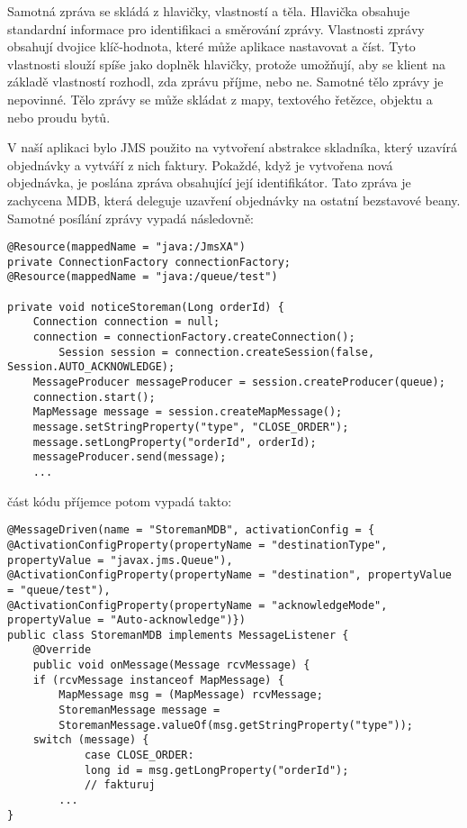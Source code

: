 \documentclass[122pt,oneside]{fithesis}
\begin{document}
Samotná zpráva se skládá z hlavičky, vlastností a těla. Hlavička obsahuje standardní informace pro identifikaci a směrování zprávy. Vlastnosti zprávy obsahují dvojice klíč-hodnota, které může aplikace nastavovat a číst. Tyto vlastnosti slouží spíše jako doplněk hlavičky, protože umožňují, aby se klient na základě vlastností rozhodl, zda zprávu příjme, nebo ne. Samotné tělo zprávy je nepovinné. Tělo zprávy se může skládat z mapy, textového řetězce, objektu a nebo proudu bytů.

V naší aplikaci bylo JMS použito na vytvoření abstrakce skladníka, který uzavírá objednávky a vytváří z nich faktury. Pokaždé, když je vytvořena nová objednávka, je poslána zpráva obsahující její identifikátor. Tato zpráva je zachycena MDB, která deleguje uzavření objednávky na ostatní bezstavové beany. Samotné posílání zprávy vypadá následovně:

\begin{lstlisting}
@Resource(mappedName = "java:/JmsXA")
private ConnectionFactory connectionFactory;
@Resource(mappedName = "java:/queue/test")

private void noticeStoreman(Long orderId) {
	Connection connection = null;
	connection = connectionFactory.createConnection();
		Session session = connection.createSession(false, Session.AUTO_ACKNOWLEDGE);
	MessageProducer messageProducer = session.createProducer(queue);
	connection.start();
	MapMessage message = session.createMapMessage();
	message.setStringProperty("type", "CLOSE_ORDER");
	message.setLongProperty("orderId", orderId);
	messageProducer.send(message);
	... 
\end{lstlisting}

část kódu příjemce potom vypadá takto:

\begin{lstlisting}
@MessageDriven(name = "StoremanMDB", activationConfig = {
@ActivationConfigProperty(propertyName = "destinationType", propertyValue = "javax.jms.Queue"),
@ActivationConfigProperty(propertyName = "destination", propertyValue = "queue/test"),
@ActivationConfigProperty(propertyName = "acknowledgeMode", propertyValue = "Auto-acknowledge")})
public class StoremanMDB implements MessageListener {
	@Override
	public void onMessage(Message rcvMessage) {
	if (rcvMessage instanceof MapMessage) {
		MapMessage msg = (MapMessage) rcvMessage;
		StoremanMessage message =
		StoremanMessage.valueOf(msg.getStringProperty("type"));
	switch (message) {
			case CLOSE_ORDER:
			long id = msg.getLongProperty("orderId");
			// fakturuj
		...
}
\end{lstlisting}
\end{document}
